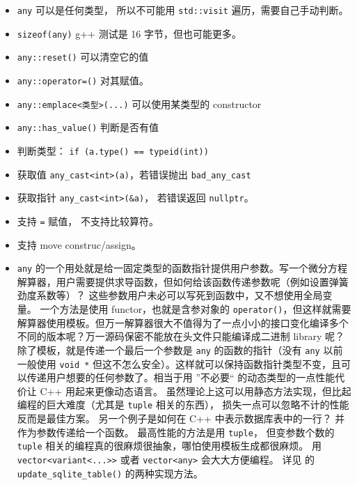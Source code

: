 \begin{itemize}
\item \verb|any| 可以是任何类型， 所以不可能用 \verb|std::visit| 遍历，需要自己手动判断。
\item \verb|sizeof(any)| g++ 测试是 16 字节，但也可能更多。
\item \verb|any::reset()| 可以清空它的值
\item \verb|any::operator=()| 对其赋值。
\item \verb|any::emplace<类型>(...)| 可以使用某类型的 constructor
\item \verb|any::has_value()| 判断是否有值
\item 判断类型： \verb|if (a.type() == typeid(int))|
\item 获取值 \verb|any_cast<int>(a)|，若错误抛出 \verb|bad_any_cast|
\item 获取指针 \verb|any_cast<int>(&a)|， 若错误返回 \verb|nullptr|。
\item 支持 \verb|=| 赋值， 不支持比较算符。
\item 支持 move construc/assign。
\item \verb|any| 的一个用处就是给一固定类型的函数指针提供用户参数。写一个微分方程解算器，用户需要提供求导函数，但如何给该函数传递参数呢（例如设置弹簧劲度系数等）？ 这些参数用户未必可以写死到函数中，又不想使用全局变量。 一个方法是使用 functor，也就是含参对象的 \verb|operator()|，但这样就需要解算器使用模板。但万一解算器很大不值得为了一点小小的接口变化编译多个不同的版本呢？万一源码保密不能放在头文件只能编译成二进制 library 呢？ 除了模板，就是传递一个最后一个参数是 \verb|any| 的函数的指针（没有 \verb|any| 以前一般使用 \verb|void *| 但这不怎么安全）。这样就可以保持函数指针类型不变，且可以传递用户想要的任何参数了。相当于用 ”不必要“ 的动态类型的一点性能代价让 C++ 用起来更像动态语言。 虽然理论上这可以用静态方法实现，但比起编程的巨大难度（尤其是 \verb|tuple| 相关的东西）， 损失一点可以忽略不计的性能反而是最佳方案。 另一个例子是如何在 C++ 中表示数据库表中的一行？ 并作为参数传递给一个函数。 最高性能的方法是用 \verb|tuple|， 但变参数个数的 \verb|tuple| 相关的编程真的很麻烦很抽象，哪怕使用模板生成都很麻烦。 用 \verb|vector<variant<...>>| 或者 \verb|vector<any>| 会大大方便编程。 详见  的 \verb|update_sqlite_table()| 的两种实现方法。
\end{itemize}
